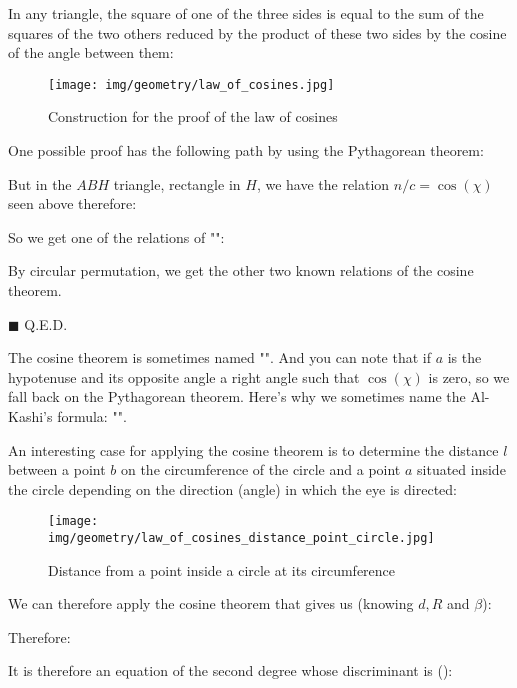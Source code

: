 	\begin{theorem}
	In any triangle, the square of one of the three sides is equal to the sum of the squares of the two others reduced by the product of these two sides by the cosine of the angle between them:
	\begin{figure}[H]
	\centering
	\texttt{[image: img/geometry/law\_of\_cosines.jpg]}
	\caption{Construction for the proof of the law of cosines}
	\end{figure}
	\end{theorem}
	\begin{dem}
	One possible proof has the following path by using the Pythagorean theorem:
	
	But in the $ABH$ triangle, rectangle in $H$, we have the relation $n/c=\cos(\chi)$ seen above therefore:
	
	So we get one of the relations of "":
	
	By circular permutation, we get the other two known relations of the cosine theorem.
	\begin{flushright}
		$\blacksquare$  Q.E.D.
	\end{flushright}
	\end{dem}
	\begin{tcolorbox}[title=Remark,colframe=black,arc=10pt]
	The cosine theorem is sometimes named  "". And you can note that if $a$ is the hypotenuse and its opposite angle a right angle such that $\cos(\chi)$ is zero, so we fall back on the Pythagorean theorem. Here's why we sometimes name the Al-Kashi's formula: "".
	\end{tcolorbox}
	An interesting case for applying the cosine theorem is to determine the distance $l$ between a point $b$ on the circumference of the circle and a point $a$ situated inside the circle depending on the direction (angle) in which the eye is directed:
	\begin{figure}[H]
	\centering
	\texttt{[image: img/geometry/law\_of\_cosines\_distance\_point\_circle.jpg]}
	\caption{Distance from a point inside a circle at its circumference}
	\end{figure}
	We can therefore apply the cosine theorem that gives us (knowing $d, R$ and $\beta$):
	
	Therefore:
	
	It is therefore an equation of the second degree whose discriminant is ():
	
